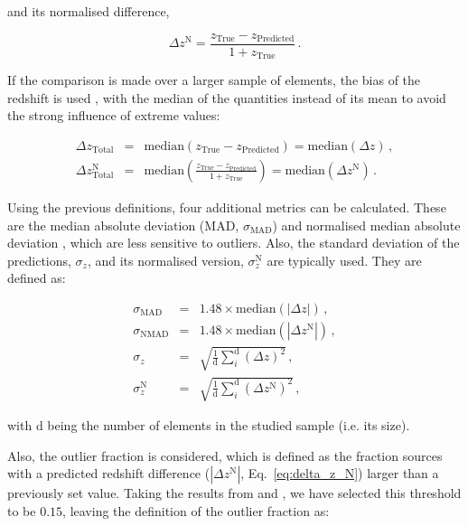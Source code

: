 \documentclass{aa}
\begin{document}
\noindent and its normalised difference,

\begin{equation}\label{eq:delta_z_N}
\Delta z^{\mathrm{N}} = \frac{z_{\mathrm{True}} - z_{\mathrm{Predicted}}}{1 + z_{\mathrm{True}}}\,.
\end{equation}

If the comparison is made over a larger sample of elements, the bias of the redshift is used \citep{2013ApJ...775...93D}, with the median of the quantities instead of its mean to avoid the strong influence of extreme values:

\begin{eqnarray}
\Delta z_{\mathrm{Total}} &=& \mathrm{median}\left(z_{\mathrm{True}} - z_{\mathrm{Predicted}}\right) = \mathrm{median}(\Delta z)\,,\\
\Delta z_{\mathrm{Total}}^{\mathrm{N}} &=& \mathrm{median}\left(\frac{z_{\mathrm{True}} - z_{\mathrm{Predicted}}}{1 + z_{\mathrm{True}}}\right) = \mathrm{median}(\Delta z^{\mathrm{N}})\,.
\end{eqnarray}

Using the previous definitions, four additional metrics can be calculated. These are the median absolute deviation (MAD, $\sigma_{\mathrm{MAD}}$) and normalised median absolute deviation \citep[NMAD, $\sigma_{\mathrm{NMAD}}$;][]{hoaglin1983understanding, 2009ApJ...690.1236I}, which are less sensitive to outliers. Also, the standard deviation of the predictions, $\sigma_{z}$, and its normalised version, $\sigma_{z}^{\mathrm{N}}$ are typically used. They are defined as:

\begin{eqnarray}
\sigma_{\mathrm{MAD}} &=& 1.48 \times \mathrm{median}\left(|\Delta z|\right)\,,\\
\sigma_{\mathrm{NMAD}} &=& 1.48 \times \mathrm{median}\left(\left|\Delta z^{\mathrm{N}}\right|\right)\,,\\
\sigma_{z} &=& \sqrt{\frac{1}{\mathrm{d}} \sum_{i}^{\mathrm{d}} \left(\Delta z\right)^{2}}\,,\\
\sigma_{z}^{\mathrm{N}} &=& \sqrt{\frac{1}{\mathrm{d}} \sum_{i}^{\mathrm{d}} \left(\Delta z^{\mathrm{N}}\right)^{2}}\,,
\end{eqnarray}

\noindent with d being the number of elements in the studied sample (i.e. its size).

Also, the outlier fraction \citep[$\eta$, as used in][]{2013ApJ...775...93D, 2022A&C....3800510L} is considered, which is defined as the fraction sources with a predicted redshift difference ($\left|\Delta z^{\mathrm{N}}\right|$, Eq.~\ref{eq:delta_z_N}) larger than a previously set value. Taking the results from \citet{2009ApJ...690.1236I} and \citet{2010A&A...523A..31H}, we have selected this threshold to be $0.15$, leaving the definition of the outlier fraction as:
\end{document}
